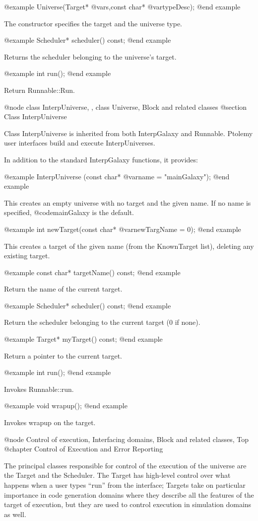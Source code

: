 @example
Universe(Target* @var{s},const char* @var{typeDesc});
@end example

The constructor specifies the target and the universe type.

@example
Scheduler* scheduler() const;
@end example

Returns the scheduler belonging to the universe's target.

@example
int run();
@end example

Return Runnable::Run.

@node class InterpUniverse,  , class Universe, Block and related classes
@section Class InterpUniverse

Class InterpUniverse is inherited from both InterpGalaxy and Runnable.
Ptolemy user interfaces build and execute InterpUniverses.

In addition to the standard InterpGalaxy functions, it provides:

@example
InterpUniverse (const char* @var{name} = "mainGalaxy");
@end example

This creates an empty universe with no target and the given name.
If no name is specified, @code{mainGalaxy} is the default.

@example
int newTarget(const char* @var{newTargName} = 0);
@end example

This creates a target of the given name (from the KnownTarget list),
deleting any existing target.

@example
const char* targetName() const;
@end example

Return the name of the current target.

@example
Scheduler* scheduler() const;
@end example

Return the scheduler belonging to the current target (0 if none).

@example
Target* myTarget() const;
@end example

Return a pointer to the current target.

@example
int run();
@end example

Invokes Runnable::run.

@example
void wrapup();
@end example

Invokes wrapup on the target.

@node Control of execution, Interfacing domains, Block and related classes, Top
@chapter Control of Execution and Error Reporting

The principal classes responsible for control of the execution of the
universe are the Target and the Scheduler.  The Target has high-level
control over what happens when a user types ``run'' from the interface;
Targets take on particular importance in code generation domains where
they describe all the features of the target of execution, but they
are used to control execution in simulation domains as well.

